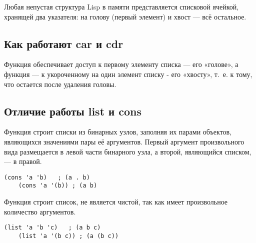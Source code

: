 \documentclass[a4paper,oneside,12pt]{extreport}
\begin{document}
Любая непустая структура Lisp в памяти представляется списковой ячейкой, хранящей два указателя: на голову (первый элемент) и хвост — всё остальное.

\subsection*{Как работают car и cdr}

Функция  обеспечивает доступ к первому элементу списка — его «голове», а функция  — к укороченному на один элемент списку - его «хвосту», т.~е. к тому, что остается после удаления головы.

\subsection*{Отличие работы list и cons}

Функция  строит списки из бинарных узлов, заполняя их парами объектов, являющихся значениями пары её аргументов.
Первый аргумент произвольного вида размещается в левой части бинарного узла, а второй, являющийся списком, — в правой.

\begin{lstlisting}[style=lispinline, gobble=8]
	(cons 'a 'b)   ; (a . b)
	(cons 'a '(b)) ; (a b)
\end{lstlisting}

Функция  строит список, не является чистой, так как имеет произвольное количество аргументов.
\begin{lstlisting}[style=lispinline, gobble=8]
	(list 'a 'b 'c)   ; (a b c)
	(list 'a '(b c)) ; (a (b c))
\end{lstlisting}
\end{document}

